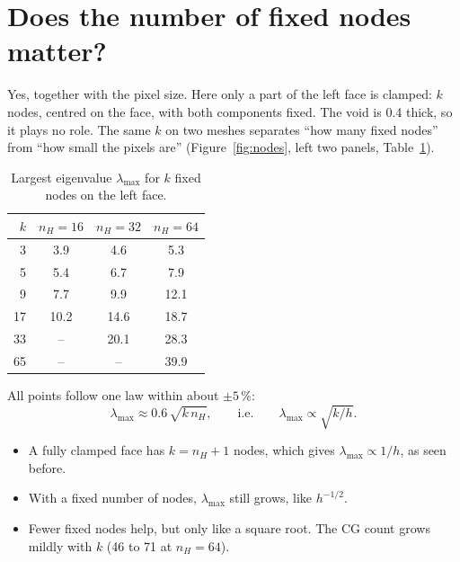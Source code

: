 \documentclass[11pt,a4paper]{article}
\begin{document}
\section{Does the number of fixed nodes matter?}
\label{sec:nodes}

Yes, together with the pixel size. Here only a part of the left face is clamped: $k$ nodes, centred on the face, with
both components fixed. The void is 0.4 thick, so it plays no role. The same $k$ on two meshes separates ``how many fixed
nodes'' from ``how small the pixels are'' (Figure~\ref{fig:nodes}, left two panels, Table~\ref{tab:nodes}).

\begin{table}[h]
  \centering\small
  \begin{tabular}{rccc}
    \toprule
    $k$ & $n_H = 16$ & $n_H = 32$ & $n_H = 64$ \\
    \midrule
    3  & 3.9  & 4.6  & 5.3 \\
    5  & 5.4  & 6.7  & 7.9 \\
    9  & 7.7  & 9.9  & 12.1 \\
    17 & 10.2 & 14.6 & 18.7 \\
    33 & --   & 20.1 & 28.3 \\
    65 & --   & --   & 39.9 \\
    \bottomrule
  \end{tabular}
  \caption{Largest eigenvalue $\lambda_{\max}$ for $k$ fixed nodes on the left face.}
  \label{tab:nodes}
\end{table}

All points follow one law within about $\pm 5\,\%$:
\[
  \lambda_{\max} \approx 0.6\,\sqrt{k\, n_H}, \qquad\text{i.e.}\qquad \lambda_{\max} \propto \sqrt{k/h}.
\]
\begin{itemize}
  \item A fully clamped face has $k = n_H + 1$ nodes, which gives $\lambda_{\max} \propto 1/h$, as seen before.
  \item With a fixed number of nodes, $\lambda_{\max}$ still grows, like $h^{-1/2}$.
  \item Fewer fixed nodes help, but only like a square root. The CG count grows mildly with $k$ (46 to 71 at
        $n_H = 64$).
\end{itemize}

\end{document}

